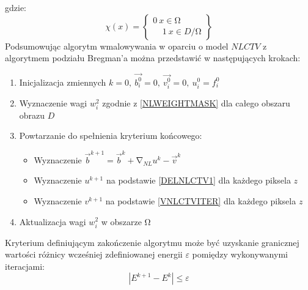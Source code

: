 \documentclass[12pt, twoside, openany]{report}
\theoremstyle{definition}
\begin{document}
gdzie:
\begin{equation}
{\chi }\left(x\right)=\left\{ \begin{array}{c}
0 \ x \in  \mathrm{\Omega} \\ 
\ \ \ \ \ 1 \ x \in  D/\mathrm{\Omega} \end{array}
\right\}
\end{equation}
Podsumowując algorytm wmalowywania w oparciu o model $NLCTV$ z algorytmem podziału Bregman’a można przedstawić w następujących krokach:
\begin{enumerate}
\item  
Inicjalizacja zmiennych $k=0,\ \overrightarrow{b^0_i}=0,\ \overrightarrow{v^0_i}=0,\ u^0_i=f^0_i$ 
\item  
Wyznaczenie wagi $w^2_i$ zgodnie z \eqref{NLWEIGHTMASK} dla całego obszaru obrazu $D$
\item  
Powtarzanie do spełnienia kryterium końcowego:
\begin{itemize}
\item
\noindent Wyznaczenie ${\overrightarrow{b}}^{k+1}={\overrightarrow{b}}^k+{\mathrm{\nabla }}_{NL}u^k-{\overrightarrow{v}}^k$
\item
\noindent Wyznaczenie $u^{k+1}$ na podstawie \eqref{DELNLCTV1} dla każdego piksela $z$
\item
\noindent Wyznaczenie $v^{k+1}$ na podstawie \eqref{VNLCTVITER} dla każdego piksela $z$
\end{itemize}
\item  
Aktualizacja wagi $w^2_i$ w obszarze $\mathrm{\Omega }$
\end{enumerate}
Kryterium definiującym zakończenie algorytmu może być uzyskanie granicznej wartości różnicy wcześniej zdefiniowanej energii $\varepsilon$ pomiędzy wykonywanymi iteracjami:
\begin{equation}
\left|E^{k+1}-E^k\right|\le \varepsilon
\end{equation}
\end{document}
